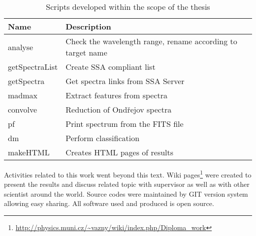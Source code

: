 \begin{table}[ht]
  \centering
  \small
     \begin{tabular}[ht]{l l}
       \toprule
       Name & Description \\
       \midrule
       analyse & Check the wavelength range, rename according to
       target name\\
       getSpectraList & Create SSA compliant list \\
       getSpectra & Get spectra links from SSA Server\\
       madmax & Extract features from spectra \\
       convolve &  Reduction of Ond\v{r}ejov spectra\\
       pf & Print spectrum from the FITS file \\
       dm &  Perform classification\\
       makeHTML & Creates HTML pages of results \\ 
       \bottomrule
   \end{tabular}
  \caption{Scripts developed within the scope of the thesis}
  \label{tab:scripts}
\end{table}


\noindent Activities related to this work went beyond this text. Wiki
pages\footnote{\url{http://physics.muni.cz/~vazny/wiki/index.php/Diploma_work}}
were created to present the results and discuss related topic with
supervisor as well as with other scientist around the world. Source
codes were maintained by GIT version system allowing easy sharing. All
software used and produced is open source.







